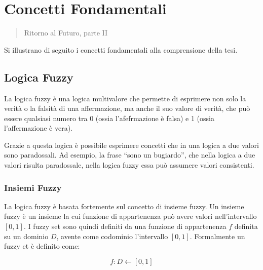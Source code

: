 \chapter{Concetti Fondamentali}
\label{cap:concetti}
\thispagestyle{empty}

\begin{quotation}
{\footnotesize
{}
\begin{flushright}
Ritorno al Futuro, parte II
\end{flushright}
}
\end{quotation}
\vspace{0.5cm}

Si illustrano di seguito i concetti fondamentali alla comprensione della tesi.

\section{Logica Fuzzy}
La logica fuzzy è una logica multivalore che permette di esprimere non solo la verità o la falsità di una affermazione, ma anche il suo valore di verità, che può essere qualsiasi numero tra 0 (ossia l'afefrmazione è falsa) e 1 (ossia l'affermazione è vera).

Grazie a questa logica è possibile esprimere concetti che in una logica a due valori sono paradossali.
Ad esempio, la frase ``sono un bugiardo'', che nella logica a due valori risulta paradossale, nella logica fuzzy essa può assumere valori consistenti.

\subsection{Insiemi Fuzzy}
La logica fuzzy è basata fortemente sul concetto di insieme fuzzy. Un insieme fuzzy è un insieme la cui funzione di appartenenza può avere valori nell'intervallo $[0, 1]$.
I fuzzy set sono quindi definiti da una funzione di appartenenza $f$ definita su un dominio $D$, avente come codominio l'intervallo $[0,  1]$.  Formalmente un fuzzy et è definito come:

\begin{equation*}
 f:D\leftarrow [0, 1]
\end{equation*}

